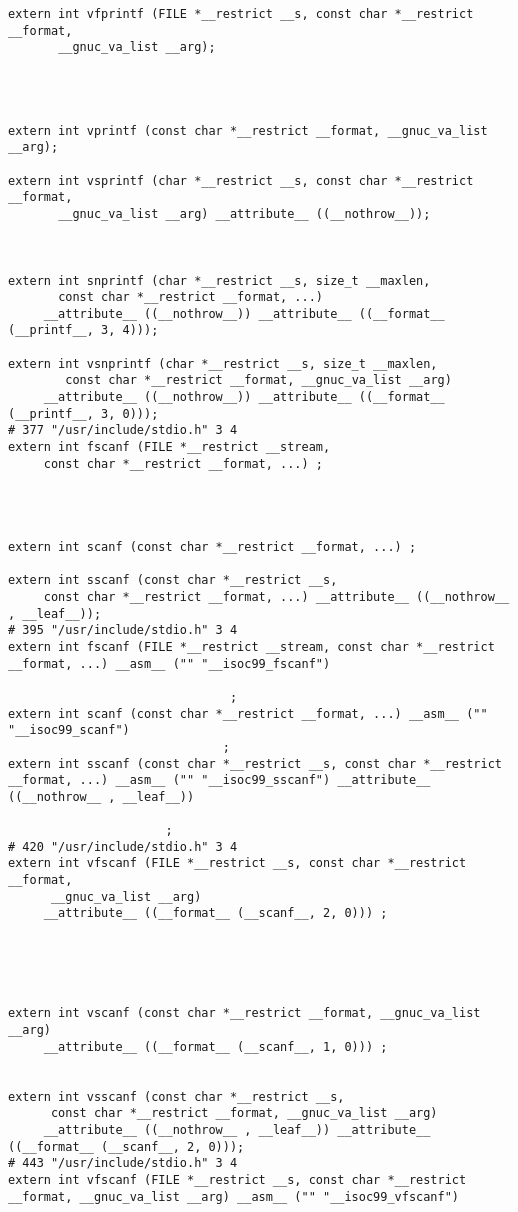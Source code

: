 \documentclass[11pt]{article}
\begin{document}
\begin{verbatim}
extern int vfprintf (FILE *__restrict __s, const char *__restrict __format,
       __gnuc_va_list __arg);




extern int vprintf (const char *__restrict __format, __gnuc_va_list __arg);

extern int vsprintf (char *__restrict __s, const char *__restrict __format,
       __gnuc_va_list __arg) __attribute__ ((__nothrow__));



extern int snprintf (char *__restrict __s, size_t __maxlen,
       const char *__restrict __format, ...)
     __attribute__ ((__nothrow__)) __attribute__ ((__format__ (__printf__, 3, 4)));

extern int vsnprintf (char *__restrict __s, size_t __maxlen,
        const char *__restrict __format, __gnuc_va_list __arg)
     __attribute__ ((__nothrow__)) __attribute__ ((__format__ (__printf__, 3, 0)));
# 377 "/usr/include/stdio.h" 3 4
extern int fscanf (FILE *__restrict __stream,
     const char *__restrict __format, ...) ;




extern int scanf (const char *__restrict __format, ...) ;

extern int sscanf (const char *__restrict __s,
     const char *__restrict __format, ...) __attribute__ ((__nothrow__ , __leaf__));
# 395 "/usr/include/stdio.h" 3 4
extern int fscanf (FILE *__restrict __stream, const char *__restrict __format, ...) __asm__ ("" "__isoc99_fscanf")

                               ;
extern int scanf (const char *__restrict __format, ...) __asm__ ("" "__isoc99_scanf")
                              ;
extern int sscanf (const char *__restrict __s, const char *__restrict __format, ...) __asm__ ("" "__isoc99_sscanf") __attribute__ ((__nothrow__ , __leaf__))

                      ;
# 420 "/usr/include/stdio.h" 3 4
extern int vfscanf (FILE *__restrict __s, const char *__restrict __format,
      __gnuc_va_list __arg)
     __attribute__ ((__format__ (__scanf__, 2, 0))) ;





extern int vscanf (const char *__restrict __format, __gnuc_va_list __arg)
     __attribute__ ((__format__ (__scanf__, 1, 0))) ;


extern int vsscanf (const char *__restrict __s,
      const char *__restrict __format, __gnuc_va_list __arg)
     __attribute__ ((__nothrow__ , __leaf__)) __attribute__ ((__format__ (__scanf__, 2, 0)));
# 443 "/usr/include/stdio.h" 3 4
extern int vfscanf (FILE *__restrict __s, const char *__restrict __format, __gnuc_va_list __arg) __asm__ ("" "__isoc99_vfscanf")




\end{verbatim}
\end{document}
